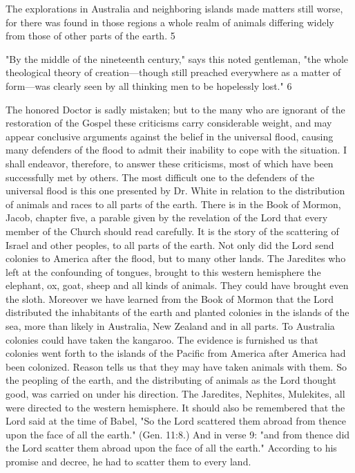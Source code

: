 The explorations in Australia and neighboring islands made matters still worse, for there was
found in those regions a whole realm of animals differing widely from those of other parts of
the earth. 5

"By the middle of the nineteenth century," says this noted gentleman, "the whole theological
theory of creation—though still preached everywhere as a matter of form—was clearly seen
by all thinking men to be hopelessly lost." 6

The honored Doctor is sadly mistaken; but to the many who are ignorant of the restoration of
the Gospel these criticisms carry considerable weight, and may appear conclusive arguments
against the belief in the universal flood, causing many defenders of the flood to admit their
inability to cope with the situation. I shall endeavor, therefore, to answer these criticisms,
most of which have been successfully met by others. The most difficult one to the defenders
of the universal flood is this one presented by Dr. White in relation to the distribution of
animals and races to all parts of the earth. There is in the Book of Mormon, Jacob, chapter
five, a parable given by the revelation of the Lord that every member of the Church should
read carefully. It is the story of the scattering of Israel and other peoples, to all parts of the
earth. Not only did the Lord send colonies to America after the flood, but to many other
lands. The Jaredites who left at the confounding of tongues, brought to this western
hemisphere the elephant, ox, goat, sheep and all kinds of animals. They could have brought
even the sloth. Moreover we have learned from the Book of Mormon that the Lord
distributed the inhabitants of the earth and planted colonies in the islands of the sea, more
than likely in Australia, New Zealand and in all parts. To Australia colonies could have taken
the kangaroo. The evidence is furnished us that colonies went forth to the islands of the
Pacific from America after America had been colonized. Reason tells us that they may have
taken animals with them. So the peopling of the earth, and the distributing of animals as the
Lord thought good, was carried on under his direction. The Jaredites, Nephites, Mulekites, all
were directed to the western hemisphere. It should also be remembered that the Lord said at
the time of Babel, "So the Lord scattered them abroad from thence upon the face of all the
earth." (Gen. 11:8.) And in verse 9: "and from thence did the Lord scatter them abroad upon
the face of all the earth." According to his promise and decree, he had to scatter them to
every land.

